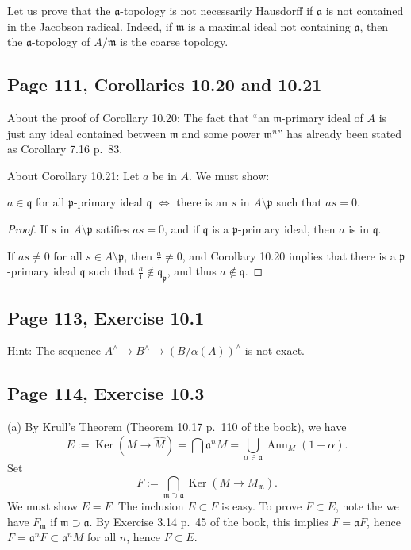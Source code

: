 \documentclass[parskip=half,fontsize=12pt]{scrartcl}%
\newcommand{\oo}{\operatorname}\newcommand{\ooo}{\operatorname*}
\newcommand{\mf}{\mathfrak}
\newcommand{\aaa}{\mf a}
\newcommand{\mmm}{\mf m}
\newcommand{\ppp}{\mf p}
\newcommand{\Ker}{\operatorname{Ker}}\newcommand{\Coker}{\operatorname{Coker}}
\begin{document}
Let us prove that the $\aaa$-topology is not necessarily Hausdorff if $\aaa$ is not contained in the Jacobson radical. Indeed, if $\mmm$ is a maximal ideal not containing $\aaa$, then the $\aaa$-topology of $A/\mmm$ is the coarse topology. 

\subsection{Page 111, Corollaries 10.20 and 10.21}%

About the proof of Corollary 10.20: The fact that ``an $\mf m$-primary ideal of $A$ is just any ideal contained between $\mf m$ and some power $\mf m^n$'' has already been stated as Corollary 7.16 p.~83.

About Corollary 10.21: Let $a$ be in $A$. We must show: 

$a\in\mf q$ for all $\ppp$-primary ideal $\mf q$ $\iff$ there is an $s$ in $A\setminus\ppp$ such that $as=0$. 

\begin{proof} 
If $s$ in $A\setminus\ppp$ satifies $as=0$, and if $\mf q$ is a $\ppp$-primary ideal, then $a$ is in $\mf q$.

If $as\neq0$ for all $s\in A\setminus\ppp$, then $\frac a1\neq0$, and Corollary 10.20 implies that there is a $\ppp$-primary ideal $\mf q$ such that $\frac a1\notin\mf q_\ppp$, and thus $a\notin\mf q$. 
\end{proof}

\subsection{Page 113, Exercise 10.1}%

Hint: The sequence $A^\land\to B^\land\to(B/\alpha(A))^\land$ is not exact. 

\subsection{Page 114, Exercise 10.3}%

(a) By Krull's Theorem (Theorem 10.17 p.~110 of the book), we have 
$$
E:=\Ker(M\to\widehat M)=\bigcap\aaa^nM=\bigcup_{\alpha\in\aaa}\oo{Ann}_M(1+\alpha). 
$$ 
Set 
$$
F:=\bigcap_{\mmm\supset\aaa}\Ker(M\to M_\mmm). 
$$ 
We must show $E=F$. The inclusion $E\subset F$ is easy. To prove $F\subset E$, note the we have $F_\mmm$ if $\mmm\supset\aaa$. By Exercise 3.14 p.~45 of the book, this implies $F=\aaa F$, hence $F=\aaa^nF\subset\aaa^nM$ for all $n$, hence $F\subset E$. 
\end{document}
